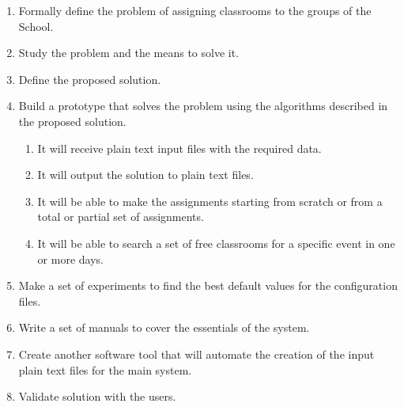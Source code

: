 \begin{enumerate}

    \item Formally define the problem of assigning classrooms to the groups of the School.

    \item Study the problem and the means to solve it.

    \item Define the proposed solution.

    \item Build a prototype that solves the problem using the algorithms described in the proposed solution.

        \begin{enumerate}

            \item It will receive plain text input files with the required data.

            \item It will output the solution to plain text files.

            \item It will be able to make the assignments starting from scratch or from a total or partial set of assignments.

            \item It will be able to search a set of free classrooms for a specific event in one or more days.

        \end{enumerate}

    \item Make a set of experiments to find the best default values for the configuration files.

    \item Write a set of manuals to cover the essentials of the system.

    \item Create another software tool that will automate the creation of the input plain text files for the main system.

    \item Validate solution with the users.

\end{enumerate}

